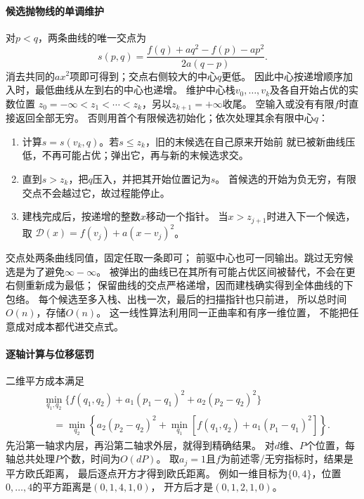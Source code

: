 \paragraph{候选抛物线的单调维护}
对$p<q$，两条曲线的唯一交点为
\begin{equation}
 s(p,q)=\frac{f(q)+aq^2-f(p)-ap^2}{2a(q-p)}.
 \label{eq:graph-parabola-intersection}
\end{equation}
消去共同的$ax^2$项即可得到；交点右侧较大的中心$q$更低。
因此中心按递增顺序加入时，最低曲线从左到右的中心也递增。
维护中心栈$v_0,\ldots,v_k$及各自开始占优的实数位置
$z_0=-\infty<z_1<\cdots<z_k$，另以$z_{k+1}=+\infty$收尾。
空输入或没有有限$f$时直接返回全部无穷。
否则用首个有限候选初始化；依次处理其余有限中心$q$：
\begin{enumerate}
 \item 计算$s=s(v_k,q)$。若$s\leq z_k$，旧的末候选在自己原来开始前
       就已被新曲线压低，不再可能占优；弹出它，再与新的末候选求交。
 \item 直到$s>z_k$，把$q$压入，并把其开始位置记为$s$。
       首候选的开始为负无穷，有限交点不会越过它，故过程能停止。
 \item 建栈完成后，按递增的整数$x$移动一个指针。
       当$x>z_{j+1}$时进入下一个候选，取
       $\mathcal D(x)=f(v_j)+a(x-v_j)^2$。
\end{enumerate}
交点处两条曲线同值，固定任取一条即可；
前驱中心也可一同输出。跳过无穷候选是为了避免$\infty-\infty$。
被弹出的曲线已在其所有可能占优区间被替代，不会在更右侧重新成为最低；
保留曲线的交点严格递增，因而建栈确实得到全体曲线的下包络。
每个候选至多入栈、出栈一次，最后的扫描指针也只前进，
所以总时间$O(n)$，存储$O(n)$。
这一线性算法利用同一正曲率和有序一维位置，
不能把任意成对成本都代进交点式。

\paragraph{逐轴计算与位移惩罚}
二维平方成本满足
\[
 \begin{aligned}
 &\min_{q_1,q_2}\{f(q_1,q_2)+a_1(p_1-q_1)^2+a_2(p_2-q_2)^2\}\\
 &\quad=\min_{q_2}\left\{a_2(p_2-q_2)^2+
   \min_{q_1}[f(q_1,q_2)+a_1(p_1-q_1)^2]\right\}.
 \end{aligned}
\]
先沿第一轴求内层，再沿第二轴求外层，就得到精确结果。
对$d$维、$P$个位置，每轴总共处理$P$个数，时间为$O(dP)$。
取$a_j=1$且$f$为前述零/无穷指标时，结果是平方欧氏距离，
最后逐点开方才得到欧氏距离。
例如一维目标为$\{0,4\}$，位置$0,\ldots,4$的平方距离是$(0,1,4,1,0)$，
开方后才是$(0,1,2,1,0)$。

